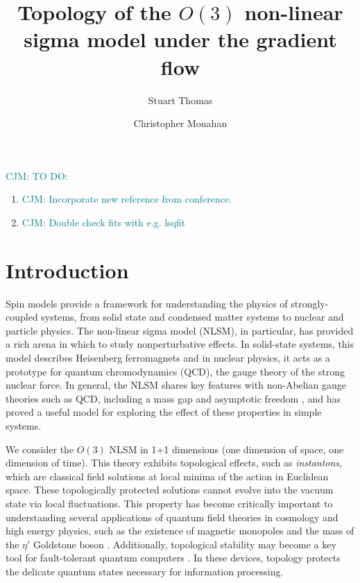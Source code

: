 \documentclass[a4paper,11pt]{article}
\title{Topology of the $O(3)$ non-linear sigma model under the gradient flow}
\author*[a]{Stuart Thomas}
\author[a,b]{Christopher Monahan}
\affiliation[a]{Department of Physics, William \& Mary, \\ 300 Ukrop Way, Williamsburg, VA, USA} %
\affiliation[b]{Thomas Jefferson National Accelerator Facility, \\ 12000 Jefferson Avenue, Newport News, VA, USA} %
\newcommand\chris[1]{\textcolor{teal}{CJM: #1}}
\begin{document}
\maketitle

\chris{TO DO:}
\begin{enumerate}
 \item \chris{Incorporate new reference from conference.}
 \item \chris{Double check fits with e.g. lsqfit}
\end{enumerate}

\section{Introduction}
\label{sec:introduction}
Spin models provide a framework for understanding the physics of strongly-coupled systems, from solid state and condensed matter systems to nuclear and particle physics. The non-linear sigma model (NLSM), in particular, has provided a rich arena in which to study nonperturbative effects. In solid-state systems, this model describes Heisenberg ferromagnets \cite{callan1985} and in nuclear physics, it acts as a prototype for quantum chromodynamics (QCD), the gauge theory of the strong nuclear force. In general, the NLSM shares key features with non-Abelian gauge theories such as QCD, including a mass gap and asymptotic freedom \cite{polyakov1975}, and has proved a useful model for exploring the effect of these properties in simple systems.

We consider the $O(3)$ NLSM in 1+1 dimensions (one dimension of space, one dimension of time). This theory exhibits topological effects, such as \textit{instantons}, which are classical field solutions at local minima of the action in Euclidean space. These topologically protected solutions cannot evolve into the vacuum state via local fluctuations. This property has become critically important to understanding several applications of quantum field theories in cosmology and high energy physics, such as the existence of magnetic monopoles \cite{goddard1986} and the mass of the $\eta'$ Goldstone boson \cite{witten1979, veneziano1979}. Additionally, topological stability may become a key tool for fault-tolerant quantum computers \cite{kitaev1997}. In these devices, topology protects the delicate quantum states necessary for information processing.
\end{document}
